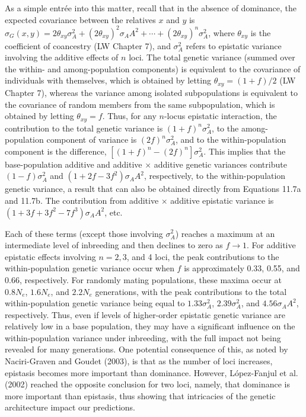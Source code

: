 \documentclass{article}
\begin{document}
As a simple entrée into this matter, recall that in the absence of dominance, the expected covariance between the relatives $x$ and $y$ is $\sigma_G(x,y) = 2\theta_{xy}\sigma_A^2 + (2\theta_{xy})^2\sigma_AA^2 + \cdots + (2\theta_{xy})^n\sigma_A^2$, where $\theta_{xy}$ is the coefficient of coancestry (LW Chapter 7), and $\sigma_A^2$ refers to epistatic variance involving the additive effects of $n$ loci. The total genetic variance (summed over the within- and among-population components) is equivalent to the covariance of individuals with themselves, which is obtained by letting $\theta_{xy} = (1 + f)/2$ (LW Chapter 7), whereas the variance among isolated subpopulations is equivalent to the covariance of random members from the same subpopulation, which is obtained by letting $\theta_{xy} = f$. Thus, for any $n$-locus epistatic interaction, the contribution to the total genetic variance is $(1 + f)^n\sigma_A^2$, to the among-population component of variance is $(2f)^n\sigma_A^2$, and to the within-population component is the difference, $[(1 + f)^n - (2f)^n]\sigma_A^2$. This implies that the base-population additive and additive $\times$ additive genetic variances contribute $(1 - f)\sigma_A^2$ and $(1 + 2f - 3f^2)\sigma_AA^2$, respectively, to the within-population genetic variance, a result that can also be obtained directly from Equations 11.7a and 11.7b. The contribution from additive $\times$ additive epistatic variance is $(1 + 3f + 3f^2 - 7f^3)\sigma_AA^2$, etc.

Each of these terms (except those involving  $ \sigma_A^2 $) reaches a maximum at an intermediate level of inbreeding and then declines to zero as  $ f \to 1 $. For additive epistatic effects involving  $ n = 2, 3 $, and 4 loci, the peak contributions to the within-population genetic variance occur when  $ f $ is approximately 0.33, 0.55, and 0.66, respectively. For randomly mating populations, these maxima occur at  $ 0.8N_e $,  $ 1.6N_e $, and  $ 2.2N_e $ generations, with the peak contributions to the total within-population genetic variance being equal to  $ 1.33\sigma_A^2 $,  $ 2.39\sigma_A^2 $, and  $ 4.56\sigma_AA^2 $, respectively. Thus, even if levels of higher-order epistatic genetic variance are relatively low in a base population, they may have a significant influence on the within-population variance under inbreeding, with the full impact not being revealed for many generations. One potential consequence of this, as noted by Naciri-Graven and Goudet (2003), is that as the number of loci increases, epistasis becomes more important than dominance. However, López-Fanjul et al. (2002) reached the opposite conclusion for two loci, namely, that dominance is more important than epistasis, thus showing that intricacies of the genetic architecture impact our predictions.
\end{document}

